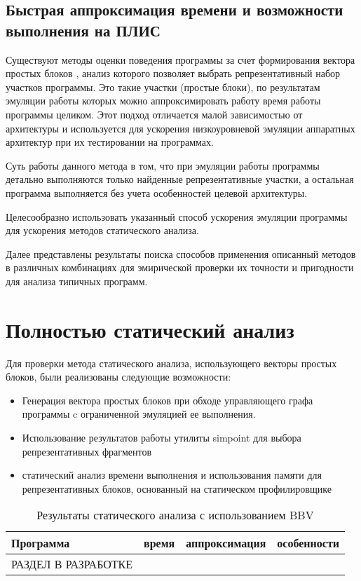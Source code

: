 \documentclass[utf8]{psta}%
\begin{document}
\subsection{Быстрая аппроксимация времени и возможности выполнения на ПЛИС} 

Существуют методы оценки поведения программы за счет формирования вектора  простых блоков \cite{Sherwood2002}, анализ которого позволяет выбрать репрезентативный набор участков программы. Это такие участки (простые блоки), по результатам эмуляции работы которых можно аппроксимировать работу время работы программы целиком. Этот подход отличается малой зависимостью от архитектуры и используется для ускорения низкоуровневой эмуляции аппаратных архитектур при их тестировании на программах.

Суть работы данного метода в том, что при эмуляции работы программы детально выполняются только найденные репрезентативные участки, а остальная программа выполняется без учета особенностей целевой архитектуры.

Целесообразно использовать указанный способ ускорения эмуляции программы  для ускорения методов статического анализа.

Далее представлены результаты поиска способов применения описанный методов в различных комбинациях для эмирической проверки их точности и пригодности для анализа типичных программ.

\section{Полностью статический анализ}

Для проверки метода статического анализа, использующего векторы простых блоков, были реализованы следующие возможности:

\begin{itemize}
    \item Генерация вектора простых блоков при обходе управляющего графа программы c ограниченной эмуляцией ее выполнения.
    \item Использование результатов работы утилиты simpoint \cite{Simpoint2005} для выбора репрезентативных фрагментов
    \item статический анализ времени выполнения и использования памяти для репрезентативных блоков, основанный на статическом профилировщике
\end{itemize}

\begin{table}
    \begin{tabular}{ | p{1.5cm} | p{2cm} | p{1cm} | p{6cm} |}
    \hline
    Программа & время & аппроксимация & особенности \\ \hline
    РАЗДЕЛ В РАЗРАБОТКЕ
    \end{tabular} 
    \caption{Результаты статического анализа с использованием BBV}
    \label{table:CHStoneSingularLoops}
\end{table}
\end{document}
